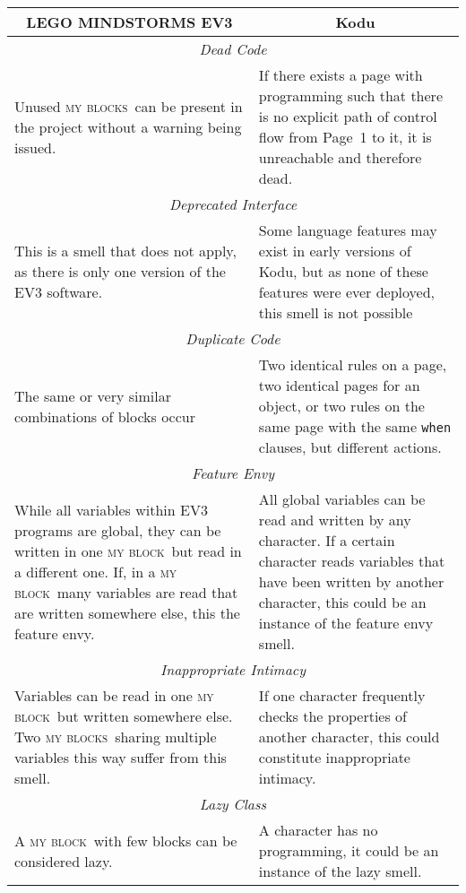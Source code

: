 \documentclass[conference]{IEEEtran}
\newcommand{\ms}{LEGO MINDSTORMS EV3}
\newcommand{\mbs}{\textsc{my blocks}}
\newcommand{\mb}{\textsc{my block}}
\begin{document}
\begin{table*}
\caption{Smell definitions for \ms~and Kodu \label{smelldefs}}
\begin{tabular}{ p{3.38in}  p{3.37in} } 
\multicolumn{1}{c}{\textbf{\ms}} & \multicolumn{1}{c}{\textbf{Kodu}} \\ \bottomrule
\multicolumn{2}{c}{\emph{Dead Code}} \\ \hline
Unused \mbs~can be present in the project without a warning being issued. %
& If there exists a page with programming such that there is no explicit path of control flow from Page~1 to it, it is unreachable and therefore dead. 
\\ \bottomrule
\multicolumn{2}{c}{ \emph{Deprecated Interface}}\\ \hline
This is a smell that does not apply, as there is only one version of the EV3 software. 
&Some language features may exist in early versions of Kodu, but as none of these features were ever deployed, this smell is not possible\\ \bottomrule
\multicolumn{2}{c}{ \emph{Duplicate Code}} \\ \hline
The same or very similar combinations of blocks occur
&Two identical rules on a page,  two identical pages for an object, or two rules on the same page with the same {\tt when} clauses, but different actions. \\ \bottomrule
\multicolumn{2}{c}{ \emph{Feature Envy}} \\ \hline
While all variables within EV3 programs are global, they can be written in one \mb~but read in a different one. If, in a \mb~many variables are read that are written somewhere else, this the feature envy. 
& All global variables can be read and written by any character. If a certain character reads variables that have been written by another character, this could be an instance of the feature envy smell.\\ \bottomrule
\multicolumn{2}{c}{ \emph{Inappropriate Intimacy}} \\ \hline
Variables can be read in one \mb~but written somewhere else. Two \mbs~sharing multiple variables this way suffer from this smell. 
& If one character frequently checks the properties of another character, this could constitute inappropriate intimacy.\\ \bottomrule
\multicolumn{2}{c}{ \emph{Lazy Class}} \\ \hline
A \mb~with few blocks can be considered lazy. 
& A character has no programming, it could be an instance of the lazy smell. \\ \bottomrule

\end{tabular}
\end{table*}
\end{document}

